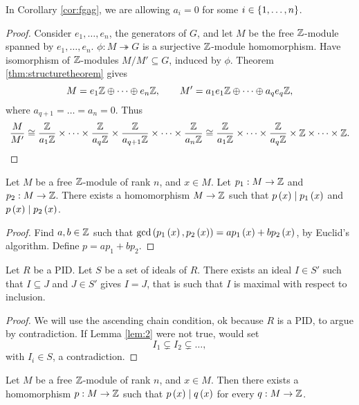 
\begin{remark*}
In Corollary \ref{cor:fgag}, we are allowing $ a_i = 0 $ for some $ i \in \left\{ 1, \dots, n \right\} $.
\end{remark*}

\begin{proof}
Consider $ e_1, \dots, e_n $, the generators of $ G $, and let $ M $ be the free $ \mathbb{Z} $-module spanned by $ e_1, \dots, e_n $. $ \phi : M \twoheadrightarrow G $ is a surjective $ \mathbb{Z} $-module homomorphism. Have isomorphism of $ \mathbb{Z} $-modules $ M / M' \subseteq G $, induced by $ \phi $. Theorem \ref{thm:structuretheorem} gives
$$ M = e_1\mathbb{Z} \oplus \dots \oplus e_n\mathbb{Z}, \qquad M' = a_1e_1\mathbb{Z} \oplus \dots \oplus a_qe_q\mathbb{Z}, $$
where $ a_{q + 1} = \dots = a_n = 0 $. Thus
$$ \dfrac{M}{M'} \cong \dfrac{\mathbb{Z}}{a_1\mathbb{Z}} \times \dots \times \dfrac{\mathbb{Z}}{a_q\mathbb{Z}} \times \dfrac{\mathbb{Z}}{a_{q + 1}\mathbb{Z}} \times \dots \times \dfrac{\mathbb{Z}}{a_n\mathbb{Z}} \cong \dfrac{\mathbb{Z}}{a_1\mathbb{Z}} \times \dots \times \dfrac{\mathbb{Z}}{a_q\mathbb{Z}} \times \mathbb{Z} \times \dots \times \mathbb{Z}. $$
\end{proof}

\begin{lemma}
\label{lem:1}
Let $ M $ be a free $ \mathbb{Z} $-module of rank $ n $, and $ x \in M $. Let $ p_1 : M \to \mathbb{Z} $ and $ p_2 : M \to \mathbb{Z} $. There exists a homomorphism $ M \to \mathbb{Z} $ such that $ p\left( x \right) \mid p_1\left( x \right) $ and $ p\left( x \right) \mid p_2\left( x \right) $.
\end{lemma}

\begin{proof}
Find $ a, b \in \mathbb{Z} $ such that $ \gcd\left( p_1\left( x \right), p_2\left( x \right) \right) = ap_1\left( x \right) + bp_2\left( x \right) $, by Euclid's algorithm. Define $ p = ap_1 + bp_2 $.
\end{proof}

\begin{lemma}
\label{lem:2}
Let $ R $ be a PID. Let $ S $ be a set of ideals of $ R $. There exists an ideal $ I \in S' $ such that $ I \subseteq J $ and $ J \in S' $ gives $ I = J $, that is such that $ I $ is maximal with respect to inclusion.
\end{lemma}

\begin{proof}
We will use the ascending chain condition, ok because $ R $ is a PID, to argue by contradiction. If Lemma \ref{lem:2} were not true, would set
$$ I_1 \subsetneq I_2 \subsetneq \dots, $$
with $ I_i \in S $, a contradiction.
\end{proof}

\begin{lemma}
\label{lem:3}
Let $ M $ be a free $ \mathbb{Z} $-module of rank $ n $, and $ x \in M $. Then there exists a homomorphism $ p : M \to \mathbb{Z} $ such that $ p\left( x \right) \mid q\left( x \right) $ for every $ q : M \to \mathbb{Z} $.
\end{lemma}

